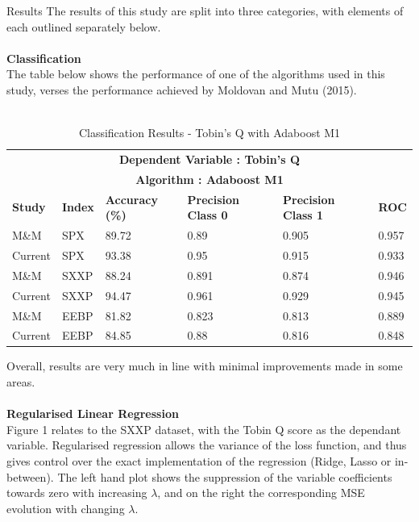 \documentclass[final]{beamer}
\newlength{\onecolwid}
\begin{document}
\begin{frame}[t]
\begin{columns}[t]
\begin{column}{\onecolwid}
	\begin{block}{Results}
	{\large \color{black} The results of this study are split into three categories, with elements of each outlined separately below. } \\~\\
         {{\bf \large \color{black} Classification}} \\
         {\large \color{black} The table below shows the performance of one of the algorithms used in this study, verses the performance achieved by Moldovan and Mutu (2015). }\\~\\
         \begin{table}[h!]
	\centering
	{\color{black}\begin{tabular}{|p{5cm}|p{4.5cm}|p{5.8cm}|p{5.8cm}|p{5.8cm}|p{4.5cm}|  }
 	\hline
 	\multicolumn{6}{|c|}{\bf \color {black}  Dependent Variable : Tobin's Q} \\
	\multicolumn{6}{|c|}{\bf \color {black}  Algorithm : Adaboost M1} \\
 	\hline
 	{\bf Study} & {\bf Index} & {\bf \small Accuracy (\%)} & {\bf \small Precision Class 0} & {\bf \small Precision Class 1} & {\bf ROC} \\
	\hline
	\rowcolor{gray} M\&M & SPX & 89.72 & 0.89 &  0.905 & 0.957  \\
 	\rowcolor{gray}Current & SPX & 93.38  & 0.95 & 0.915  &  0.933 \\
	M\&M & SXXP & 88.24     & 0.891 &  0.874 & 0.946  \\
	Current & SXXP & 94.47  & 0.961 & 0.929 & 0.945 \\
	\rowcolor{gray}M\&M & EEBP & 81.82     & 0.823 &  0.813 & 0.889  \\
	\rowcolor{gray}Current & EEBP & 84.85  & 0.88  & 0.816 & 0.848 \\ 
 	\hline
	\end{tabular}}
	\caption{\color {black} Classification Results - Tobin's Q with Adaboost M1}
	\end{table}
	{\large \color{black}Overall, results are very much in line with minimal improvements made in some areas. }\\~\\
	{{\bf \large  \color{black} Regularised Linear Regression}} \\
	{\large \color{black} Figure 1 relates to the SXXP dataset, with the Tobin Q score as the dependant variable. Regularised regression allows the variance of the loss function, and thus gives control over the exact implementation of the regression (Ridge, Lasso or in-between). The left hand plot shows the suppression of the variable coefficients towards zero with increasing $\lambda$, and on the right the corresponding MSE evolution with changing $\lambda$.    } \\~\\
	\end{block}
	

\end{column}
\end{columns}
\end{frame}
\end{document}
